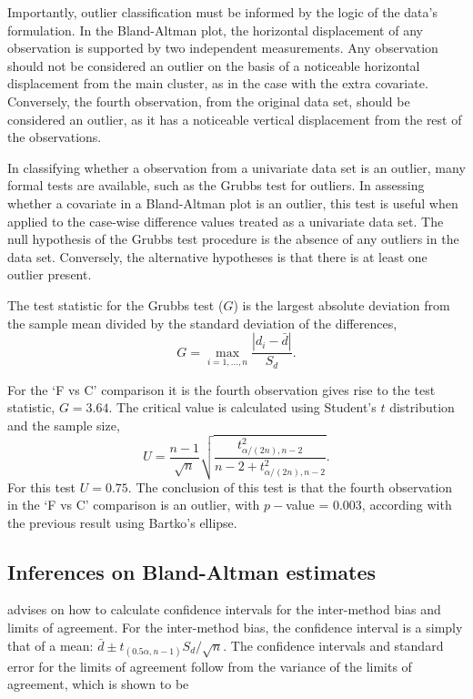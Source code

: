\documentclass[Chap2main.tex]{subfiles}
\begin{document}
Importantly, outlier classification must be informed by the logic of the
data's formulation. In the Bland-Altman plot, the horizontal displacement of any
observation is supported by two independent measurements. Any
observation should not be considered an outlier on the basis of a
noticeable horizontal displacement from the main cluster, as in
the case with the extra covariate. Conversely, the fourth
observation, from the original data set, should be considered an
outlier, as it has a noticeable vertical displacement from the
rest of the observations.



In classifying whether a observation from a univariate data set is
an outlier, many formal tests are available, such as the Grubbs test for outliers. In assessing
whether a covariate in a Bland-Altman plot is an outlier, this
test is useful when applied to the case-wise difference values treated as a
univariate data set. The null hypothesis of the Grubbs test procedure is the absence
of any outliers in the data set. Conversely, the alternative hypotheses is that there is at least one outlier
present.

The test statistic for the Grubbs test ($G$) is the largest
absolute deviation from the sample mean divided by the standard
deviation of the differences,
\[
G =  \displaystyle\max_{i=1,\ldots, n}\frac{\left \vert d_i -
	\bar{d}\right\vert}{S_{d}}.
\]

For the `F vs C' comparison it is the fourth observation gives
rise to the test statistic, $G = 3.64$. The critical value is
calculated using Student's $t$ distribution and the sample size,
\[
U = \frac{n-1}{\sqrt{n}} \sqrt{\frac{t_{\alpha/(2n),n-2}^2}{n - 2
		+ t_{\alpha/(2n),n-2}^2}}.
\]
For this test $U = 0.75$. The conclusion of this test is that the fourth observation in the `F vs C' comparison is an outlier, with $p-$value = 0.003, according with the previous result using Bartko's ellipse.

\newpage



\subsection{Inferences on Bland-Altman estimates}
\citet*{BA99}advises on how to calculate confidence intervals for the inter-method bias and limits of agreement.
For the inter-method bias, the confidence interval is a simply that of a mean: $\bar{d} \pm t_{(0.5\alpha,n-1)} S_{d}/\sqrt{n}$.
The confidence
intervals and standard error for the limits of agreement follow from the variance of the limits of agreement, which is shown to be
\end{document}
